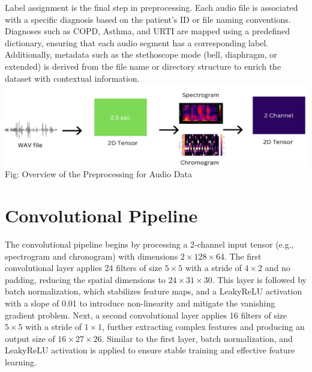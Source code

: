 \documentclass[twocolumn]{article}
\begin{document}
Label assignment is the final step in preprocessing. Each audio file is associated with a specific diagnosis based on the patient's ID or file naming conventions. Diagnoses such as COPD, Asthma, and URTI are mapped using a predefined dictionary, ensuring that each audio segment has a corresponding label. Additionally, metadata such as the stethoscope mode (bell, diaphragm, or extended) is derived from the file name or directory structure to enrich the dataset with contextual information.
\includegraphics[scale=0.4]{Pre-Prrocessing.png}
Fig: Overview of the Preprocessing for Audio Data

\section{Convolutional Pipeline}
The convolutional pipeline begins by processing a 2-channel input tensor (e.g., spectrogram and chronogram) with dimensions \(2 \times 128 \times 64\). The first convolutional layer applies 24 filters of size \(5 \times 5\) with a stride of \(4 \times 2\) and no padding, reducing the spatial dimensions to \(24 \times 31 \times 30\). This layer is followed by batch normalization, which stabilizes feature maps, and a LeakyReLU activation with a slope of 0.01 to introduce non-linearity and mitigate the vanishing gradient problem. Next, a second convolutional layer applies 16 filters of size \(5 \times 5\) with a stride of \(1 \times 1\), further extracting complex features and producing an output size of \(16 \times 27 \times 26\). Similar to the first layer, batch normalization, and LeakyReLU activation is applied to ensure stable training and effective feature learning.
\end{document}
